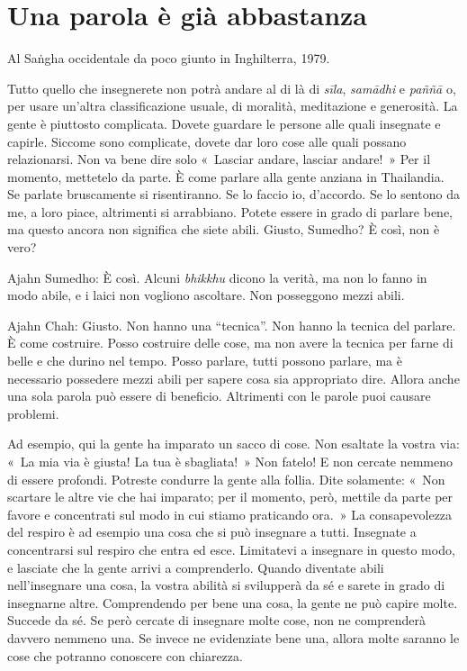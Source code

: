 \chapter{Una parola è già abbastanza}

\begin{openingQuote}
  \centering

  Al Saṅgha occidentale da poco giunto in Inghilterra, 1979.
\end{openingQuote}

Tutto quello che insegnerete non potrà andare al di là di \emph{sīla},
\emph{samādhi} e \emph{paññā} o, per usare un'altra classificazione
usuale, di moralità, meditazione e generosità. La gente è piuttosto
complicata. Dovete guardare le persone alle quali insegnate e capirle.
Siccome sono complicate, dovete dar loro cose alle quali possano
relazionarsi. Non va bene dire solo «~Lasciar andare, lasciar andare!~»
Per il momento, mettetelo da parte. È come parlare alla gente anziana in
Thailandia. Se parlate bruscamente si risentiranno. Se lo faccio io,
d'accordo. Se lo sentono da me, a loro piace, altrimenti si arrabbiano.
Potete essere in grado di parlare bene, ma questo ancora non significa
che siete abili. Giusto, Sumedho? È così, non è vero?

Ajahn Sumedho: È così. Alcuni \emph{bhikkhu} dicono la verità, ma non lo
fanno in modo abile, e i laici non vogliono ascoltare. Non posseggono
mezzi abili.

Ajahn Chah: Giusto. Non hanno una ``tecnica''. Non hanno la tecnica del
parlare. È come costruire. Posso costruire delle cose, ma non avere la
tecnica per farne di belle e che durino nel tempo. Posso parlare, tutti
possono parlare, ma è necessario possedere mezzi abili per sapere cosa
sia appropriato dire. Allora anche una sola parola può essere di
beneficio. Altrimenti con le parole puoi causare problemi.

Ad esempio, qui la gente ha imparato un sacco di cose. Non esaltate la
vostra via: «~La mia via è giusta! La tua è sbagliata!~» Non fatelo! E
non cercate nemmeno di essere profondi. Potreste condurre la gente alla
follia. Dite solamente: «~Non scartare le altre vie che hai imparato;
per il momento, però, mettile da parte per favore e concentrati sul modo
in cui stiamo praticando ora.~» La consapevolezza del respiro è ad
esempio una cosa che si può insegnare a tutti. Insegnate a concentrarsi
sul respiro che entra ed esce. Limitatevi a insegnare in questo modo, e
lasciate che la gente arrivi a comprenderlo. Quando diventate abili
nell'insegnare una cosa, la vostra abilità si svilupperà da sé e sarete
in grado di insegnarne altre. Comprendendo per bene una cosa, la gente
ne può capire molte. Succede da sé. Se però cercate di insegnare molte
cose, non ne comprenderà davvero nemmeno una. Se invece ne evidenziate
bene una, allora molte saranno le cose che potranno conoscere con
chiarezza.

